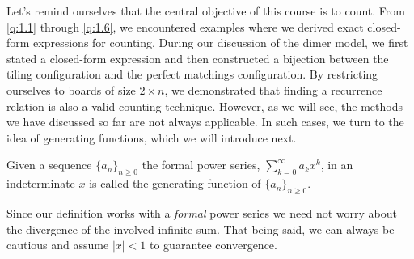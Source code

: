 Let's remind ourselves that the central objective of this course is to count. From \cref{q:1.1} through \cref{q:1.6}, we encountered examples where we derived exact closed-form expressions for counting. During our discussion of the dimer model, we first stated a closed-form expression and then constructed a bijection between the tiling configuration and the perfect matchings configuration. By restricting ourselves to boards of size $2 \times n$, we demonstrated that finding a recurrence relation is also a valid counting technique. However, as we will see, the methods we have discussed so far are not always applicable. In such cases, we turn to the idea of generating functions, which we will introduce next.

\begin{definition}
	Given a sequence $\{a_{n}\}_{n \ge 0}$ the formal power series, $\sum_{k=0}^{\infty}a_{k}x^k$, in an indeterminate $x$ is called the generating function of $\{a_{n}\}_{n \ge 0}$.
\end{definition}

Since our definition works with a \textit{formal} power series we need not worry about the divergence of the involved infinite sum. That being said, we can always be cautious and assume $|x|<1$ to guarantee convergence. 

